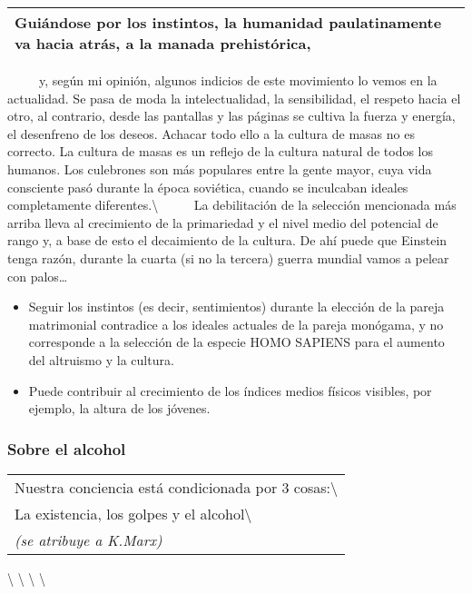 \begin{longtable}[]{@{}l@{}}
\toprule
Guiándose por los instintos, la humanidad paulatinamente va hacia atrás,
a la manada prehistórica,\tabularnewline
\bottomrule
\end{longtable}

~ ~ ~ y, según mi opinión, algunos indicios de este movimiento lo vemos
en la actualidad. Se pasa de moda la intelectualidad, la sensibilidad,
el respeto hacia el otro, al contrario, desde las pantallas y las
páginas se cultiva la fuerza y energía, el desenfreno de los deseos.
Achacar todo ello a la cultura de masas no es correcto. La cultura de
masas es un reflejo de la cultura natural de todos los humanos. Los
culebrones son más populares entre la gente mayor, cuya vida consciente
pasó durante la época soviética, cuando se inculcaban ideales
completamente diferentes.\textbackslash{} ~ ~ ~ La debilitación de la
selección mencionada más arriba lleva al crecimiento de la primariedad y
el nivel medio del potencial de rango y, a base de esto el decaimiento
de la cultura. De ahí puede que Einstein tenga razón, durante la cuarta
(si no la tercera) guerra mundial vamos a pelear con palos\ldots{}

\begin{itemize}
\tightlist
\item
  Seguir los instintos (es decir, sentimientos) durante la elección de
  la pareja matrimonial contradice a los ideales actuales de la pareja
  monógama, y no corresponde a la selección de la especie HOMO SAPIENS
  para el aumento del altruismo y la cultura.
\item
  Puede contribuir al crecimiento de los índices medios físicos
  visibles, por ejemplo, la altura de los jóvenes.
\end{itemize}

\protect\hypertarget{M12}{}{}

\subsubsection{Sobre el alcohol}\label{sobre-el-alcohol}

\begin{longtable}[]{@{}l@{}}
\toprule
Nuestra conciencia está condicionada por 3
cosas:\textbackslash{}\tabularnewline
La existencia, los golpes y el alcohol\textbackslash{}\tabularnewline
\emph{(se atribuye a K.Marx)}\tabularnewline
\bottomrule
\end{longtable}

\textbackslash{} \textbackslash{} \textbackslash{} \textbackslash{}

